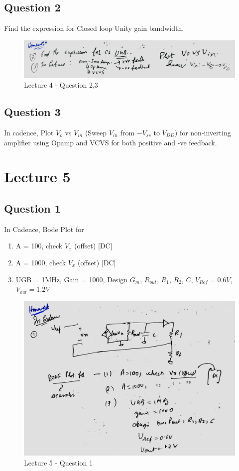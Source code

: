 \documentclass[a4paper]{article}
\begin{document}
\subsection{Question 2}
Find the expression for Closed loop Unity gain bandwidth.
\begin{figure}
    \centering
    \includegraphics[width=0.8\linewidth]{images/Lec_4_Q_2_3.jpeg}
    \caption{Lecture 4 - Question 2,3}
\end{figure}
\subsection{Question 3}
In cadence, Plot $V_o$ vs $V_{in}$ (Sweep $V_{in}$ from $-V_{ss}$ to $V_{DD}$) for non-inverting amplifier using Opamp and VCVS for both positive and -ve feedback.
\section{Lecture 5}
\subsection{Question 1}
In Cadence, Bode Plot for 
\begin{enumerate}
    \item A = 100, check $V_x$ (offset) [DC]
    \item A = 1000, check $V_x$ (offset) [DC]
    \item UGB = 1MHz, Gain = 1000, Design $G_m$, $R_{out}$, $R_{1}$, $R_{2}$, $C$, $V_{Ref} = 0.6V$, $V_{out} = 1.2V$
\end{enumerate}
\begin{figure}
    \centering
    \includegraphics[width=0.8\linewidth]{images/Lec_5_Q_1.jpeg}
    \caption{Lecture 5 - Question 1}
\end{figure}
\end{document}
